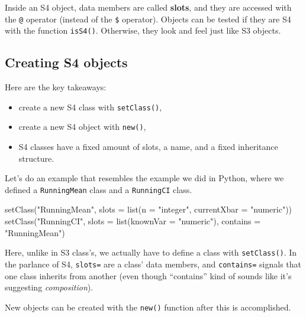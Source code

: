 \documentclass[
  12pt,
  krantz2]{krantz}
\makeatletter
\newenvironment{Shaded}{\begin{snugshade}}{\end{snugshade}}
\newcommand{\AttributeTok}[1]{\textcolor[rgb]{0.61,0.61,0.61}{#1}}
\newcommand{\FunctionTok}[1]{\textcolor[rgb]{0,0,0}{#1}}
\newcommand{\NormalTok}[1]{#1}
\newcommand{\StringTok}[1]{\textcolor[rgb]{0.5,0.5,0.5}{#1}}
\providecommand{\tightlist}{%
  \setlength{\itemsep}{0pt}\setlength{\parskip}{0pt}}
\newenvironment{kframe}{%
\medskip{}
\setlength{\fboxsep}{.8em}
 \def\at@end@of@kframe{}%
 \ifinner\ifhmode%
  \def\at@end@of@kframe{\end{minipage}}%
  \begin{minipage}{\columnwidth}%
 \fi\fi%
 \def\FrameCommand##1{\hskip\@totalleftmargin \hskip-\fboxsep
 \colorbox{shadecolor}{##1}\hskip-\fboxsep
     \hskip-\linewidth \hskip-\@totalleftmargin \hskip\columnwidth}%
 \MakeFramed {\advance\hsize-\width
   \@totalleftmargin\z@ \linewidth\hsize
   \@setminipage}}%
 {\par\unskip\endMakeFramed%
 \at@end@of@kframe}
\renewenvironment{Shaded}{\begin{kframe}}{\end{kframe}}
\makeatother
\begin{document}
Inside an S4 object, data members are called \textbf{slots}, and they are accessed with the \texttt{@} operator (instead of the \texttt{\$} operator). Objects can be tested if they are S4 with the function \texttt{isS4()}. Otherwise, they look and feel just like S3 objects.

\hypertarget{creating-s4-objects}{%
\subsection{Creating S4 objects}\label{creating-s4-objects}}

Here are the key takeaways:

\begin{itemize}
\tightlist
\item
  create a new S4 class with \texttt{setClass()},
\item
  create a new S4 object with \texttt{new()},
\item
  S4 classes have a fixed amount of slots, a name, and a fixed inheritance structure.
\end{itemize}

Let's do an example that resembles the example we did in Python, where we defined a \texttt{RunningMean} class and a \texttt{RunningCI} class.

\begin{Shaded}
\begin{Highlighting}[]
\FunctionTok{setClass}\NormalTok{(}\StringTok{"RunningMean"}\NormalTok{,}
         \AttributeTok{slots =} \FunctionTok{list}\NormalTok{(}\AttributeTok{n =} \StringTok{"integer"}\NormalTok{, }
                      \AttributeTok{currentXbar =} \StringTok{"numeric"}\NormalTok{))}
\FunctionTok{setClass}\NormalTok{(}\StringTok{"RunningCI"}\NormalTok{,}
         \AttributeTok{slots =} \FunctionTok{list}\NormalTok{(}\AttributeTok{knownVar =} \StringTok{"numeric"}\NormalTok{),}
         \AttributeTok{contains =} \StringTok{"RunningMean"}\NormalTok{)}
\end{Highlighting}
\end{Shaded}

Here, unlike in S3 class's, we actually have to define a class with \texttt{setClass()}. In the parlance of S4, \texttt{slots=} are a class' data members, and \texttt{contains=} signals that one class inherits from another (even though ``contains'' kind of sounds like it's suggesting \emph{composition}).

New objects can be created with the \texttt{new()} function after this is accomplished.
\end{document}
